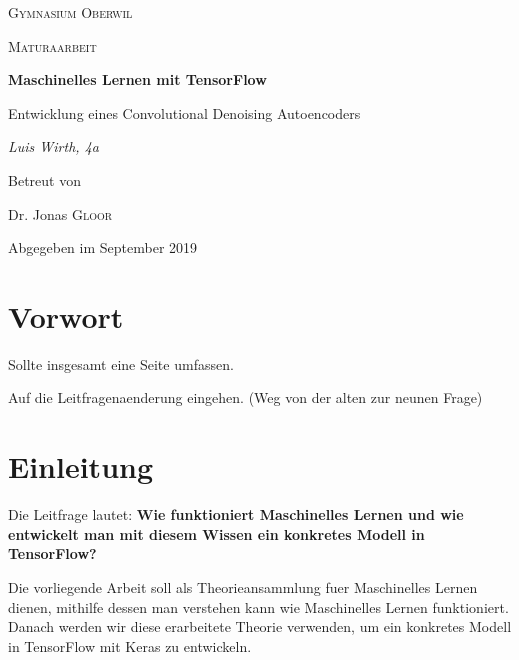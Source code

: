 
\begin{titlepage}
  \centering

  {\scshape\LARGE Gymnasium Oberwil\par}
  \vspace{1cm}
  {\scshape\Large Maturaarbeit\par}
  \vspace{1.5cm}
  {\huge\bfseries Maschinelles Lernen mit TensorFlow\par}
  \vspace{0.1cm}
  {\large Entwicklung eines Convolutional Denoising Autoencoders\par}
  \vspace{2cm}
  {\Large\itshape Luis Wirth, 4a\par}
  \vfill
  Betreut von\par
  Dr. Jonas \textsc{Gloor}

  \vfill
  {\large Abgegeben im September 2019\par}
\end{titlepage}


\tableofcontents
\pagebreak

\chapter*{Vorwort}

Sollte insgesamt eine Seite umfassen.

Auf die Leitfragenaenderung eingehen. (Weg von der alten zur neunen Frage)

\chapter*{Einleitung}

Die Leitfrage lautet:
\textbf{Wie funktioniert Maschinelles Lernen und wie entwickelt man mit diesem
  Wissen ein konkretes Modell in TensorFlow?}

\para{}

Die vorliegende Arbeit soll als Theorieansammlung fuer Maschinelles Lernen
dienen, mithilfe dessen man verstehen kann wie Maschinelles Lernen funktioniert.
Danach werden wir diese erarbeitete Theorie verwenden, um ein konkretes Modell
in TensorFlow mit Keras zu entwickeln.

